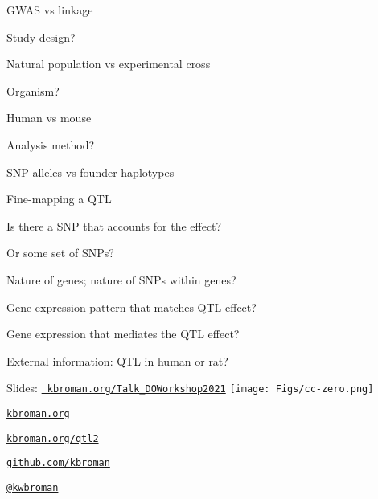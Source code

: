 \documentclass[12pt,t,aspectratio=169]{beamer}
\begin{document}
\begin{frame}{GWAS vs linkage}


  \bbi
\item Study design?
  \bi
\item[] Natural population vs experimental cross
  \ei
\item Organism?
  \bi
\item[] Human vs mouse
  \ei
\item Analysis method?
  \bi
\item[] SNP alleles vs founder haplotypes
  \ei
  \ei

\end{frame}



\begin{frame}{Fine-mapping a QTL}


  \bbi
\item Is there a SNP that accounts for the effect?
\item Or some set of SNPs?
\item Nature of genes; nature of SNPs within genes?
\item Gene expression pattern that matches QTL effect?
\item Gene expression that mediates the QTL effect?
\item External information: QTL in human or rat?
  \ei

\end{frame}




\begin{frame}[c]{}

\Large

{Slides:} \href{https://kbroman.org/Talk_DOWorkshop2021}{\tt
  \color{foreground} kbroman.org/Talk\_DOWorkshop2021} \quad
\texttt{[image: Figs/cc-zero.png]}

\vspace{7mm}

\href{https://kbroman.org}{\tt kbroman.org}

\vspace{7mm}

\href{https://kbroman.org/qtl2}{\tt kbroman.org/qtl2}

\vspace{7mm}

\href{https://github.com/kbroman}{\tt github.com/kbroman}

\vspace{7mm}

\href{https://twitter.com/kwbroman}{\tt @kwbroman}


\end{frame}
\end{document}
